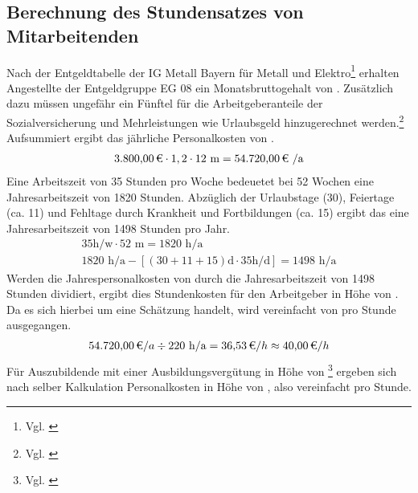 
\subsection{Berechnung des Stundensatzes von Mitarbeitenden}
\label{app:Stundensatz}
Nach der Entgeldtabelle der IG Metall Bayern für Metall und Elektro\footnote{Vgl. \cite{Entgeldtabelle}} erhalten Angestellte der Entgeldgruppe EG 08 ein Monatsbruttogehalt von . Zusätzlich dazu müssen ungefähr ein Fünftel für die Arbeitgeberanteile der Sozialversicherung und Mehrleistungen wie Urlaubsgeld hinzugerechnet werden.\footnote{Vgl. \cite{Personalkosten}} Aufsummiert ergibt das jährliche Personalkosten von .
\begin{eqnarray}
\eur{3.800,00} \cdot 1,2 \cdot 12 \mbox{ m} = \eur{54.720,00} \mbox{ /a}
\end{eqnarray}
Eine Arbeitszeit von 35 Stunden pro Woche bedeuetet bei 52 Wochen eine Jahresarbeitszeit von 1820 Stunden. Abzüglich der Urlaubstage (30), Feiertage (ca. 11) und Fehltage durch Krankheit und Fortbildungen (ca. 15) ergibt das eine Jahresarbeitszeit von 1498 Stunden pro Jahr.
\begin{eqnarray}
35 \mbox{h/w} \cdot 52 \mbox{ m} = 1820 \mbox{ h/a} \\
1820 \mbox{ h/a} - [(30+11+15) \mbox{d} \cdot 35 \mbox{h/d}] = 1498 \mbox{ h/a}
\end{eqnarray}
Werden die Jahrespersonalkosten von  durch die Jahresarbeitszeit von 1498 Stunden dividiert, ergibt dies Stundenkosten für den Arbeitgeber in Höhe von . Da es sich hierbei um eine Schätzung handelt, wird vereinfacht von  pro Stunde ausgegangen.  
\begin{eqnarray}
\eur{54.720,00} /a \div 220 \mbox{ h/a} = \eur{36,53} /h \approx \eur{40,00} /h 
\end{eqnarray}
Für Auszubildende mit einer Ausbildungsvergütung in Höhe von  \footnote{Vgl. \cite{EntgeldtabelleAzubis}} ergeben sich nach selber Kalkulation Personalkosten in Höhe von , also vereinfacht  pro Stunde.